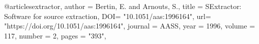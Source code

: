 
@article{sextractor,
    author = {{Bertin, E.} and {Arnouts, S.}},
    title = {SExtractor: Software for source extraction},
    DOI= "10.1051/aas:1996164",
    url= "https://doi.org/10.1051/aas:1996164",
    journal = {AASS},
    year = 1996,
    volume = 117,
    number = 2,
    pages = "393",
}
